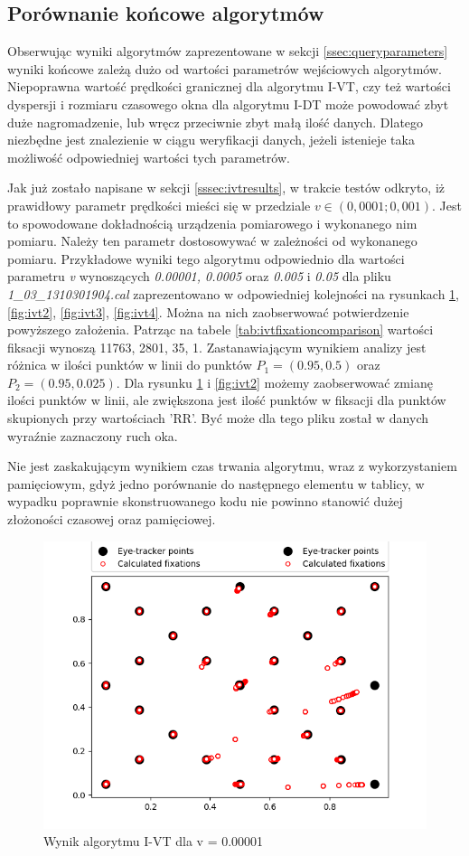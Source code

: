 \subsection{Porównanie końcowe algorytmów}
\label{ssec:compalgorithms}
Obserwując wyniki algorytmów zaprezentowane w sekcji \ref{ssec:queryparameters} wyniki końcowe zależą dużo od wartości parametrów wejściowych algorytmów. Niepoprawna wartość prędkości granicznej dla algorytmu I-VT, czy też wartości dyspersji i rozmiaru czasowego okna dla algorytmu I-DT może powodować zbyt duże nagromadzenie, lub wręcz przeciwnie zbyt małą ilość danych. Dlatego niezbędne jest znalezienie w ciągu weryfikacji danych, jeżeli istenieje taka możliwość odpowiedniej wartości tych parametrów.\par
Jak już zostało napisane w sekcji \ref{sssec:ivtresults}, w trakcie testów odkryto, iż prawidłowy parametr prędkości mieści się w przedziale $v \in (0,0001;0,001)$. Jest to spowodowane dokładnością urządzenia pomiarowego i wykonanego nim pomiaru. Należy ten parametr dostosowywać w zależności od wykonanego pomiaru. Przykładowe wyniki tego algorytmu odpowiednio dla wartości parametru \emph{v} wynoszących \emph{0.00001, 0.0005} oraz \emph{0.005} i \emph{0.05} dla pliku \emph{1\_03\_1310301904.cal} zaprezentowano w odpowiedniej kolejności na rysunkach \ref{fig:ivt1}, \ref{fig:ivt2}, \ref{fig:ivt3}, \ref{fig:ivt4}. Można na nich zaobserwować potwierdzenie powyższego założenia. Patrząc na tabele \ref{tab:ivtfixationcomparison} wartości fiksacji wynoszą 11763, 2801, 35, 1. Zastanawiającym wynikiem analizy jest różnica w ilości punktów w linii do punktów $P_1 = (0.95,0.5)$ oraz $P_2 = (0.95, 0.025)$. Dla rysunku \ref{fig:ivt1} i \ref{fig:ivt2} możemy zaobserwować zmianę ilości punktów w linii, ale zwiększona jest ilość punktów w fiksacji dla punktów skupionych przy wartościach 'RR'. Być może dla tego pliku został w danych wyraźnie zaznaczony ruch oka.\par
Nie jest zaskakującym wynikiem czas trwania algorytmu, wraz z wykorzystaniem pamięciowym, gdyż jedno porównanie do następnego elementu w tablicy, w wypadku poprawnie skonstruowanego kodu nie powinno stanowić dużej złożoności czasowej oraz pamięciowej.
\begin{figure}[H]
    \centering
    \captionsetup{justification=centering,margin=2cm}
    \includegraphics[width=0.8\linewidth]{resources/ivtresults/file1.png}
    \caption{Wynik algorytmu I-VT dla v = 0.00001}
    \label{fig:ivt1}
\end{figure}
